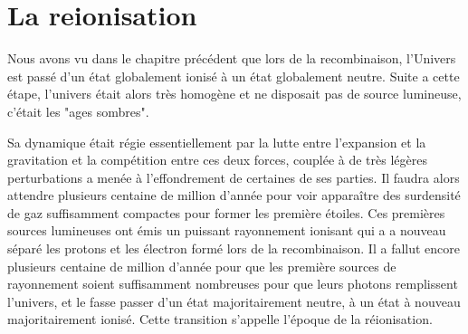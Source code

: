 \chapter{La reionisation} 
\label{sec:introreio}
%
%
%
%

Nous avons vu dans le chapitre précédent que lors de la recombinaison, l'Univers est passé d'un état globalement ionisé à un état globalement neutre.
Suite a cette étape, l'univers était alors très homogène et ne disposait pas de source lumineuse, c'était les "ages sombres".

Sa dynamique était régie essentiellement par la lutte entre l'expansion et la gravitation et la compétition entre ces deux forces, couplée à de très légères perturbations a menée à l'effondrement de certaines de ses parties.
Il faudra alors attendre plusieurs centaine de million d'année pour voir apparaître des surdensité de gaz suffisamment compactes pour former les première étoiles.
Ces premières sources lumineuses ont émis un puissant rayonnement ionisant qui a a nouveau séparé les protons et les électron formé lors de la recombinaison.
Il a fallut encore plusieurs centaine de million d'année pour que les première sources de rayonnement soient suffisamment nombreuses pour que leurs photons remplissent l'univers, et le fasse passer d'un état majoritairement neutre, à un état à nouveau majoritairement ionisé. 
Cette transition s'appelle l’époque de la réionisation.





